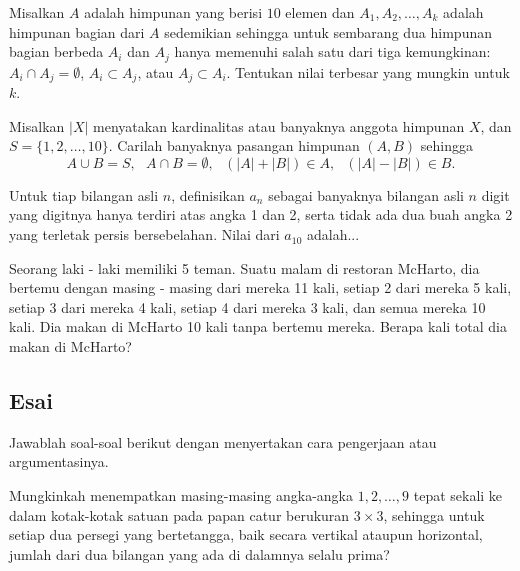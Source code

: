 \documentclass[12pt]{scrartcl}
\begin{document}
	\begin{soalbaru}
		Misalkan $A$ adalah himpunan yang berisi $10$ elemen dan $A_1,A_2,\dots,A_k$ adalah himpunan bagian dari $A$ sedemikian sehingga untuk sembarang dua himpunan bagian berbeda $A_i$ dan $A_j$ hanya memenuhi salah satu dari tiga kemungkinan: $A_i \cap A_j = \emptyset$, $A_i \subset A_j$, atau $A_j \subset A_i$. Tentukan nilai terbesar yang mungkin untuk $k$. %
	\end{soalbaru}
	
	\begin{soalbaru}
		Misalkan $|X|$ menyatakan kardinalitas atau banyaknya anggota himpunan $X$, dan $S=\{1,2,\dots,10\}$. Carilah banyaknya pasangan himpunan $(A,B)$ sehingga\\[-20pt]
		$$A \cup B = S,\text{ } A \cap B = \emptyset, \text{ } (|A|+|B|) \in A,\text{ } (|A|-|B|) \in B. $$ %
	\end{soalbaru}
	\begin{soalbaru}
		Untuk tiap bilangan asli $n$, definisikan $a_n$ sebagai banyaknya bilangan asli $n$
			digit yang digitnya hanya terdiri atas angka 1 dan 2, serta tidak ada
			dua buah angka 2 yang terletak persis bersebelahan. Nilai dari $a_{10}$ adalah...
		\end{soalbaru}

	\begin{soalbaru}
		Seorang laki - laki memiliki 5 teman. Suatu malam di restoran McHarto, dia bertemu
		dengan masing - masing dari mereka 11 kali, setiap 2 dari mereka 5 kali, setiap 3 dari mereka 4 kali, setiap 4 dari mereka 3 kali, dan semua mereka 10 kali. Dia makan di McHarto 10 kali tanpa bertemu mereka. Berapa kali total dia makan di McHarto?
	\end{soalbaru}

\subsection{Esai}
Jawablah soal-soal berikut dengan menyertakan cara pengerjaan atau argumentasinya.
	
	\begin{soalbaru} 
		Mungkinkah menempatkan masing-masing angka-angka $1,2,\dots,9$ tepat sekali ke dalam kotak-kotak satuan pada papan catur berukuran $3\times 3$, sehingga untuk setiap dua persegi yang bertetangga, baik secara vertikal ataupun horizontal, jumlah dari dua bilangan yang ada di dalamnya selalu prima?
	\end{soalbaru}
	
\end{document}

